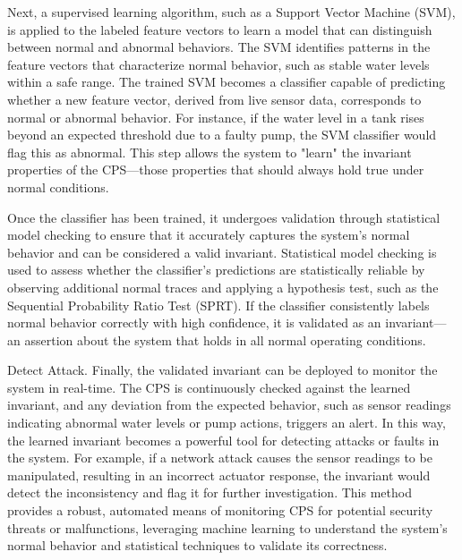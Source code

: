 Next, a supervised learning algorithm, such as a Support Vector Machine (SVM), is applied to the labeled feature vectors to learn a model that can distinguish between normal and abnormal behaviors. The SVM identifies patterns in the feature vectors that characterize normal behavior, such as stable water levels within a safe range. The trained SVM becomes a classifier capable of predicting whether a new feature vector, derived from live sensor data, corresponds to normal or abnormal behavior. For instance, if the water level in a tank rises beyond an expected threshold due to a faulty pump, the SVM classifier would flag this as abnormal. This step allows the system to "learn" the invariant properties of the CPS—those properties that should always hold true under normal conditions.

Once the classifier has been trained, it undergoes validation through statistical model checking to ensure that it accurately captures the system's normal behavior and can be considered a valid invariant. Statistical model checking is used to assess whether the classifier's predictions are statistically reliable by observing additional normal traces and applying a hypothesis test, such as the Sequential Probability Ratio Test (SPRT). If the classifier consistently labels normal behavior correctly with high confidence, it is validated as an invariant—an assertion about the system that holds in all normal operating conditions.

Detect Attack.
Finally, the validated invariant can be deployed to monitor the system in real-time. The CPS is continuously checked against the learned invariant, and any deviation from the expected behavior, such as sensor readings indicating abnormal water levels or pump actions, triggers an alert. In this way, the learned invariant becomes a powerful tool for detecting attacks or faults in the system. For example, if a network attack causes the sensor readings to be manipulated, resulting in an incorrect actuator response, the invariant would detect the inconsistency and flag it for further investigation. This method provides a robust, automated means of monitoring CPS for potential security threats or malfunctions, leveraging machine learning to understand the system's normal behavior and statistical techniques to validate its correctness\cite{28}.

